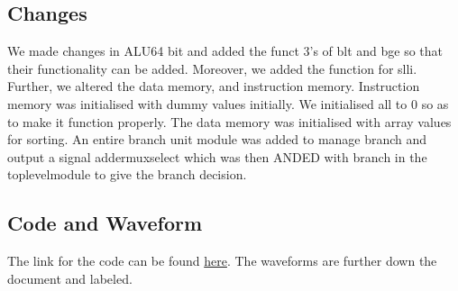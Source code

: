 \documentclass{report}
\begin{document}
\subsection{Changes}
    We made changes in ALU64 bit and added the funct 3's of blt and bge so that their functionality can be added. Moreover, we added the function for slli. Further, we altered the data memory, and instruction memory. Instruction memory was initialised with dummy values initially. We initialised all to 0 so as to make it function properly. The data memory was initialised with array values for sorting. An entire branch unit module was added to manage branch and output a signal addermuxselect which was then ANDED with branch in the toplevelmodule to give the branch decision.
    \pagebreak
\subsection{Code and Waveform}
The link for the code can be found \href{https://github.com/NehalNN10/CA-final-project/blob/main/final_project/final_project.srcs/sources_1/new/RISCV_Processor.v}{here}. The waveforms are further down the document and labeled.
\end{document}
